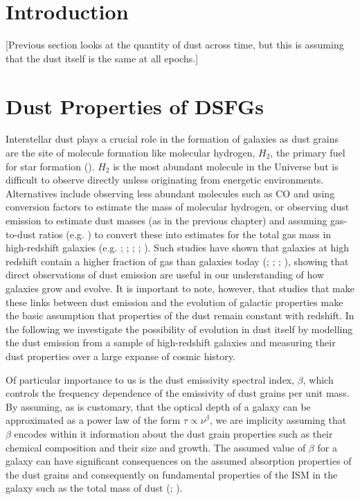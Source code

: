 \section{Introduction}

[Previous section looks at the quantity of dust across time, but this is assuming that the dust itself is the same at all epochs.]

\section{Dust Properties of DSFGs}

Interstellar dust plays a crucial role in the formation of galaxies as dust grains are the site of molecule formation like molecular hydrogen, $H_2$, the primary fuel for star formation (\citealt{Kennicutt_2012}). $H_2$ is the most abundant molecule in the Universe but is difficult to observe directly unless originating from energetic environments. Alternatives include observing less abundant molecules such as CO and using conversion factors to estimate the mass of molecular hydrogen, or observing dust emission to estimate dust masses (as in the previous chapter) and assuming gas-to-dust ratios (e.g. \citealt{Saintonge_2013}) to convert these into estimates for the total gas mass in high-redshift galaxies (e.g. \citealt{Magdis_2012}; \citealt{Eales_2012}; \citealt{Scoville_2014}; \citealt{Santini_2014}; \citealt{Genzel_2015}). Such studies have shown that galaxies at high redshift contain a higher fraction of gas than galaxies today (\citealt{Tacconi_2010}; \citealt{Scoville_2016}; \citealt{Scoville_2017}; \citealt{Millard_2020}), showing that direct observations of dust emission are useful in our understanding of how galaxies grow and evolve. It is important to note, however, that studies that make these links between dust emission and the evolution of galactic properties make the basic assumption that properties of the dust remain constant with redshift. In the following we investigate the possibility of evolution in dust itself by modelling the dust emission from a sample of high-redshift galaxies and measuring their dust properties over a large expanse of cosmic history.

Of particular importance to us is the dust emissivity spectral index, $\beta$, which controls the frequency dependence of the emissivity of dust grains per unit mass. By assuming, as is customary, that the optical depth of a galaxy can be approximated as a power law of the form $\tau \propto \nu^\beta$, we are implicity assuming that $\beta$ encodes within it information about the dust grain properties such as their chemical composition and their size and growth. The assumed value of $\beta$ for a galaxy can have significant consequences on the assumed absorption properties of the dust grains and consequently on fundamental properties of the ISM in the galaxy such as the total mass of dust (\citealt{Bianchi_2013}; \citealt{Clark_2016}).

